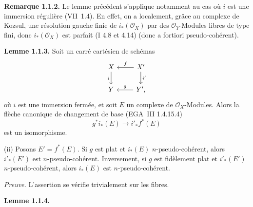 \textbf{Remarque 1.1.2.} Le lemme précédent s'applique notamment au cas où \(i\) est une immersion régulière (VII~1.4). En effet, on a localement, grâce au complexe de Kozsul, une résolution gauche finie de \(i_*(\mathcal O_X)\) par des \(\mathcal O_Y\)-Modules libres de type fini, donc \(i_*(\mathcal O_X)\) est parfait (I 4.8 et 4.14) (donc a fortiori pseudo-cohérent).

\textbf{Lemme 1.1.3.} Soit un carré cartésien de schémas
\[
\begin{tikzcd}
X \arrow[d,"i"'] & X' \arrow[l,"f"'] \arrow[d,"i'"]\\
Y & Y'{,} \arrow[l,"g"']
\end{tikzcd}
\]
où \(i\) est une immersion fermée, et soit \(E\) un complexe de \(\mathcal O_X\)-Modules. Alors la flèche canonique de changement de base (EGA~III 1.4.15.4)
\[
  g^*i_*(E)\longrightarrow i'_*f^*(E)
\]
est un isomorphisme.

(ii) Posons \(E'=f^*(E)\). Si \(g\) est plat et \(i_*(E)\) \(n\)-pseudo-cohérent, alors \(i'_*(E')\) est \(n\)-pseudo-cohérent. Inversement, si \(g\) est fidèlement plat et \(i'_*(E')\) \(n\)-pseudo-cohérent, alors \(i_*(E)\) est \(n\)-pseudo-cohérent.

\emph{Preuve.} L'assertion se vérifie trivialement sur les fibres.

\textbf{Lemme 1.1.4.}

